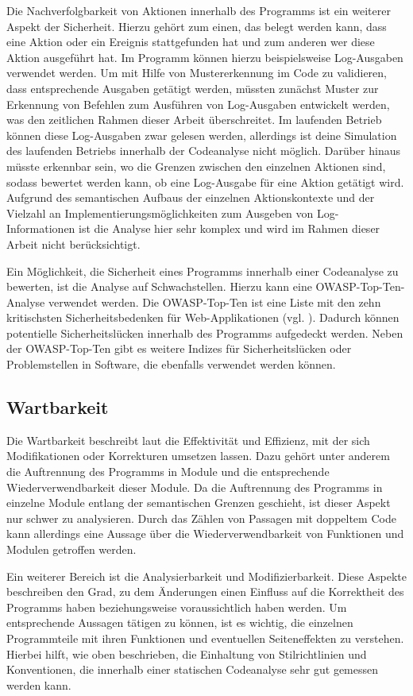\documentclass[
	oneside,  %
	ngerman, 
	final, 
	11pt, 
	a4paper, 
	1.1headlines, 
	headinclude=false, 
	footinclude=false, 
	mpinclude=false, 
	pagesize, 
	onecolumn, 
	titlepage, 
	parskip=half, 
	headsepline, 
	chapterprefix=false, 
	version=first, 
	listof=totoc, 
	bibliography=totoc, 
	toc=graduated, 
	fleqn
]{scrbook}
\begin{document}
Die Nachverfolgbarkeit von Aktionen innerhalb des Programms ist ein weiterer Aspekt der Sicherheit.
Hierzu gehört zum einen, das belegt werden kann, dass eine Aktion oder ein Ereignis stattgefunden hat und zum anderen wer diese Aktion ausgeführt hat.
Im Programm können hierzu beispielsweise Log-Ausgaben verwendet werden.
Um mit Hilfe von Mustererkennung im Code zu validieren, dass entsprechende Ausgaben getätigt werden, müssten zunächst Muster zur Erkennung von Befehlen zum Ausführen von Log-Ausgaben entwickelt werden, was den zeitlichen Rahmen dieser Arbeit überschreitet.
Im laufenden Betrieb können diese Log-Ausgaben zwar gelesen werden, allerdings ist deine Simulation des laufenden Betriebs innerhalb der Codeanalyse nicht möglich.
Darüber hinaus müsste erkennbar sein, wo die Grenzen zwischen den einzelnen Aktionen sind, sodass bewertet werden kann, ob eine Log-Ausgabe für eine Aktion getätigt wird.
Aufgrund des semantischen Aufbaus der einzelnen Aktionskontexte und der Vielzahl an Implementierungsmöglichkeiten zum Ausgeben von Log-Informationen ist die Analyse hier sehr komplex und wird im Rahmen dieser Arbeit nicht berücksichtigt.

Ein Möglichkeit, die Sicherheit eines Programms innerhalb einer Codeanalyse zu bewerten, ist die Analyse auf Schwachstellen.
Hierzu kann eine \acf{OWASP}-Top-Ten-Analyse verwendet werden. 
Die \acs{OWASP}-Top-Ten ist eine Liste mit den zehn kritischsten Sicherheitsbedenken für Web-Applikationen (vgl. \cite{Ow2020}).
Dadurch können potentielle Sicherheitslücken innerhalb des Programms aufgedeckt werden.
Neben der \acs{OWASP}-Top-Ten gibt es weitere Indizes für Sicherheitslücken oder Problemstellen in Software, die ebenfalls verwendet werden können.

\subsection{Wartbarkeit}
Die Wartbarkeit beschreibt laut \cite{ISO-25010} die Effektivität und Effizienz, mit der sich Modifikationen oder Korrekturen umsetzen lassen.
Dazu gehört unter anderem die Auftrennung des Programms in Module und die entsprechende Wiederverwendbarkeit dieser Module.
Da die Auftrennung des Programms in einzelne Module entlang der semantischen Grenzen geschieht, ist dieser Aspekt nur schwer zu analysieren.
Durch das Zählen von Passagen mit doppeltem Code kann allerdings eine Aussage über die Wiederverwendbarkeit von Funktionen und Modulen getroffen werden.

Ein weiterer Bereich ist die Analysierbarkeit und Modifizierbarkeit.
Diese Aspekte beschreiben den Grad, zu dem Änderungen einen Einfluss auf die Korrektheit des Programms haben beziehungsweise voraussichtlich haben werden.
Um entsprechende Aussagen tätigen zu können, ist es wichtig, die einzelnen Programmteile mit ihren Funktionen und eventuellen Seiteneffekten zu verstehen.
Hierbei hilft, wie oben beschrieben, die Einhaltung von Stilrichtlinien und Konventionen, die innerhalb einer statischen Codeanalyse sehr gut gemessen werden kann.
\end{document}
